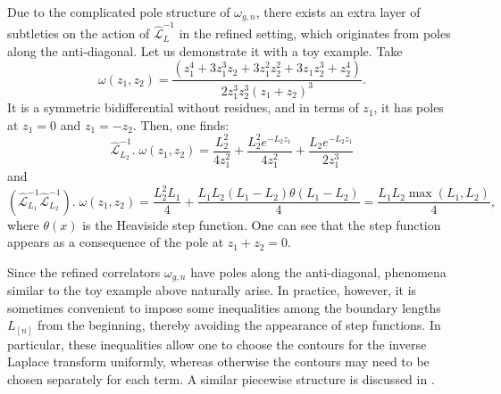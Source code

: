 \documentclass[12pt]{amsart}
\theoremstyle{plain}
\theoremstyle{definition}
\theoremstyle{remark}
\numberwithin{equation}{section}
\begin{document}
Due to the complicated pole structure of $\omega_{g,n}$, there exists an extra layer of subtleties on the action of $\hat{\mathcal{L}}^{-1}_L$ in the refined setting, which originates from poles along the anti-diagonal. Let us demonstrate it with a toy example. Take
\begin{equation*}
   \omega(z_1,z_2)=\frac{\left(z_1^4+3 z_1^3z_2+3 z_1^2 z_2^2+3 z_1z_2^3+z_2^4\right)}{2 z_1^3 z_2^3
   \left(z_1+z_2\right)^3}.
\end{equation*}
It is a symmetric bidifferential without residues, and in terms of $z_1$, it has poles at $z_1=0$ and $z_1=-z_2$. Then, one finds:
\begin{equation*}
\hat{\mathcal{L}}^{-1}_{L_2}.\;  \omega(z_1,z_2)= \frac{L_2^2}{4 z_1^2}+\frac{L_2^2 e^{-L_2 z_1}}{4 z_1^2}+\frac{L_2e^{-L_2 z_1}}{2 z_1^3}
\end{equation*}
and
\begin{equation}
  (\hat{\mathcal{L}}^{-1}_{L_1}\hat{\mathcal{L}}^{-1}_{L_2}).\; \omega(z_1,z_2)=\frac{L_2^2L_1}{4}+\frac{L_1 L_2(L_1-L_2)\theta(L_1-L_2)}{4}=\frac{L_1L_2\max(L_1,L_2)}{4},\label{L2L1}
\end{equation}
where $\theta(x)$ is the Heaviside step function. One can see that the step function appears as a consequence of the pole at $z_1+z_2=0$. 

Since the refined correlators $\omega_{g,n}$ have poles along the anti-diagonal, phenomena
similar to the toy example above naturally arise. In practice, however, it is sometimes convenient to impose some inequalities among the boundary lengths $L_{[n]}$ from the beginning, thereby avoiding the appearance of step functions. In particular, these inequalities allow one to choose the contours for the inverse Laplace transform uniformly, whereas otherwise the contours may need to be chosen separately for each term. A similar piecewise structure is discussed in \cite{CGGO26}.

\end{document}
